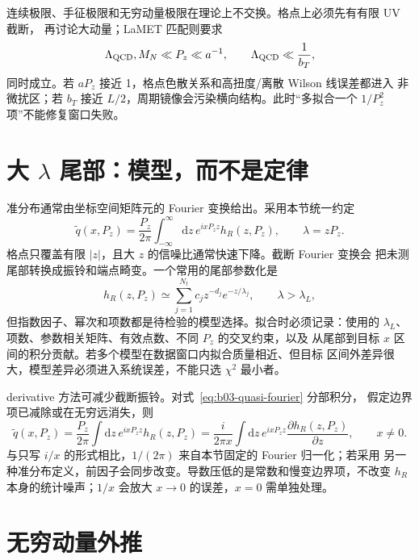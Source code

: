 连续极限、手征极限和无穷动量极限在理论上不交换。格点上必须先有有限 UV 截断，
再讨论大动量；LaMET 匹配则要求
\begin{equation}
  \Lambda_{\rm QCD},M_N\ll P_z\ll a^{-1},
  \qquad
  \Lambda_{\rm QCD}\ll \frac1{b_T},
  \label{eq:b03-lamet-window}
\end{equation}
同时成立。若 \(aP_z\) 接近 1，格点色散关系和高扭度/离散 Wilson 线误差都进入
非微扰区；若 \(b_T\) 接近 \(L/2\)，周期镜像会污染横向结构。此时“多拟合一个
\(1/P_z^2\) 项”不能修复窗口失败。

\section{大 \(\lambda\) 尾部：模型，而不是定律}

准分布通常由坐标空间矩阵元的 Fourier 变换给出。采用本节统一约定
\begin{equation}
  \widetilde q(x,P_z)
  =\frac{P_z}{2\pi}\int_{-\infty}^{\infty}\mathrm{d}z\,
  e^{ixP_z z}h_R(z,P_z),
  \qquad
  \lambda=zP_z .
  \label{eq:b03-quasi-fourier}
\end{equation}
格点只覆盖有限 \(|z|\)，且大 \(z\) 的信噪比通常快速下降。截断 Fourier 变换会
把未测尾部转换成振铃和端点畸变。一个常用的尾部参数化是
\begin{equation}
  h_R(z,P_z)\simeq\sum_{j=1}^{N_t}c_jz^{-d_j}e^{-z/\lambda_j},
  \qquad \lambda>\lambda_L,
  \label{eq:b03-tail-model}
\end{equation}
但指数因子、幂次和项数都是待检验的模型选择。拟合时必须记录：使用的
\(\lambda_L\)、项数、参数相关矩阵、有效点数、不同 \(P_z\) 的交叉约束，以及
从尾部到目标 \(x\) 区间的积分贡献。若多个模型在数据窗口内拟合质量相近、但目标
区间外差异很大，模型差异必须进入系统误差，不能只选 \(\chi^2\) 最小者。

derivative 方法可减少截断振铃。对式~\eqref{eq:b03-quasi-fourier} 分部积分，
假定边界项已减除或在无穷远消失，则
\begin{equation}
  \widetilde q(x,P_z)
  =\frac{P_z}{2\pi}\int\mathrm{d}z\,e^{ixP_z z}h_R(z,P_z)
  =\frac{i}{2\pi x}\int\mathrm{d}z\,e^{ixP_z z}
  \frac{\partial h_R(z,P_z)}{\partial z},
  \qquad x\ne0.
  \label{eq:b03-derivative-method}
\end{equation}
与只写 \(i/x\) 的形式相比，\(1/(2\pi)\) 来自本节固定的 Fourier 归一化；若采用
另一种准分布定义，前因子会同步改变。导数压低的是常数和慢变边界项，不改变
\(h_R\) 本身的统计噪声；\(1/x\) 会放大 \(x\to0\) 的误差，\(x=0\) 需单独处理。

\section{无穷动量外推}

